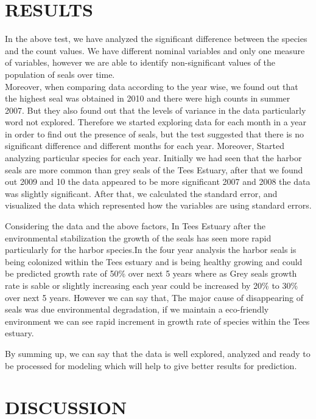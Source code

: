 \documentclass[
]{article}
\begin{document}
\hypertarget{results}{%
\section{RESULTS}\label{results}}

In the above test, we have analyzed the significant difference between
the species and the count values. We have different nominal variables
and only one measure of variables, however we are able to identify
non-significant values of the population of seals over time.\\
Moreover, when comparing data according to the year wise, we found out
that the highest seal was obtained in 2010 and there were high counts in
summer 2007. But they also found out that the levels of variance in the
data particularly word not explored. Therefore we started exploring data
for each month in a year in order to find out the presence of seals, but
the test suggested that there is no significant difference and different
months for each year. Moreover, Started analyzing particular species for
each year. Initially we had seen that the harbor seals are more common
than grey seals of the Tees Estuary, after that we found out 2009 and 10
the data appeared to be more significant 2007 and 2008 the data was
slightly significant. After that, we calculated the standard error, and
visualized the data which represented how the variables are using
standard errors.

Considering the data and the above factors, In Tees Estuary after the
environmental stabilization the growth of the seals has seen more rapid
particularly for the harbor species.In the four year analysis the harbor
seals is being colonized within the Tees estuary and is being healthy
growing and could be predicted growth rate of 50\% over next 5 years
where as Grey seals growth rate is sable or slightly increasing each
year could be increased by 20\% to 30\% over next 5 years. However we
can say that, The major cause of disappearing of seals was due
environmental degradation, if we maintain a eco-friendly environment we
can see rapid increment in growth rate of species within the Tees
estuary.

By summing up, we can say that the data is well explored, analyzed and
ready to be processed for modeling which will help to give better
results for prediction.

\hypertarget{discussion}{%
\section{DISCUSSION}\label{discussion}}
\end{document}
